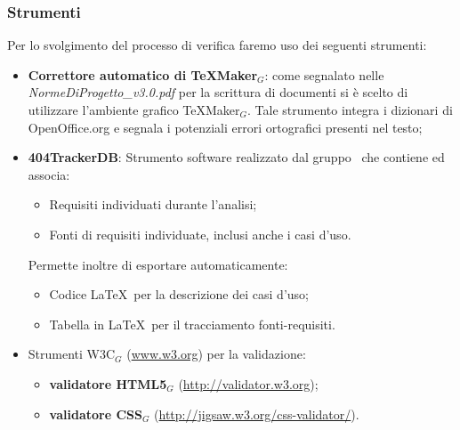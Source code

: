 \subsubsection{Strumenti}
Per lo svolgimento del processo di verifica faremo uso dei seguenti strumenti:
\begin{itemize}
	\item \textbf{Correttore automatico di TeXMaker$_G$}: come segnalato nelle \textit{NormeDiProgetto\_v3.0.pdf} per la scrittura di documenti si è scelto di utilizzare l'ambiente grafico TeXMaker$_G$. Tale strumento integra i dizionari di OpenOffice.org e segnala i potenziali
	errori ortografici presenti nel testo;

	\item \textbf{404TrackerDB}: Strumento software realizzato dal gruppo \gruppo\ che contiene ed associa:
	\begin{itemize}
		\item Requisiti individuati durante l'analisi;
		\item Fonti di requisiti individuate, inclusi anche i casi d'uso.
	\end{itemize}
	Permette inoltre di esportare automaticamente:
	\begin{itemize}
		\item Codice \LaTeX\ per la descrizione dei casi d'uso;
		\item Tabella in \LaTeX\ per il tracciamento fonti-requisiti.
	\end{itemize}

	\item Strumenti W3C$_G$ (\href{www.w3.org}{www.w3.org}) per la validazione:
	    \begin{itemize}
	    	\item \textbf{validatore HTML5$_G$} (\href{http://validator.w3.org}{http://validator.w3.org});
	    	\item \textbf{validatore CSS$_G$}
	    	(\href{http://jigsaw.w3.org/css-validator/}{http://jigsaw.w3.org/css-validator/}).
	    \end{itemize}
	

\end{itemize}
